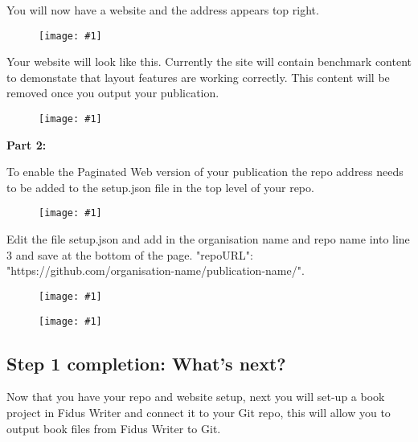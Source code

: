 \documentclass{article}
\newlength{\imgwidth}
\newcommand\scaledgraphics[2]{%
                
\settowidth{\imgwidth}{\texttt{[image: \#1]}}%
                
\setlength{\imgwidth}{\minof{\imgwidth}{#2\textwidth}}%
                
\texttt{[image: \#1]}%
                
}
\begin{document}
\begin{enumerate}
You will now have a website and the address appears top right.

\begin{figure}
\scaledgraphics{8a364c1f-1553-4b44-9974-77307c345b2e.png}{1}
\label{F8612631}
\end{figure}


Your website will look like this. Currently the site will contain benchmark content to demonstate that layout features are working correctly. This content will be removed once you output your publication.

\begin{figure}
\scaledgraphics{a0b7b868-c526-485f-8f20-c2460cb693ac.png}{1}
\label{F85415421}
\end{figure}


\textbf{Part 2:}


To enable the Paginated Web version of your publication the repo address needs to be added to the setup.json file in the top level of your repo.

\begin{figure}
\scaledgraphics{fde2c425-6646-447e-94ee-d0d93459de8a.png}{1}
\label{F23728731}
\end{figure}


Edit the file setup.json and add in the organisation name and repo name into line 3 and save at the bottom of the page. "repoURL": "https://github.com/organisation-name/publication-name/".

\begin{figure}
\scaledgraphics{a4d479fd-2aea-4114-8740-571c5d952b93.png}{1}
\label{F41371831}
\end{figure}

\begin{figure}
\scaledgraphics{693958a1-b909-4dfd-ac6a-0ede6a0c344b.png}{1}
\label{F50720561}
\end{figure}


\end{enumerate}

\subsection{Step 1 completion: What's next?}\label{H4342812}



Now that you have your repo and website setup, next you will set-up a book project in Fidus Writer and connect it to your Git repo, this will allow you to output book files from Fidus Writer to Git.





\printbibliography[title={Bibliography}]
\end{document}
